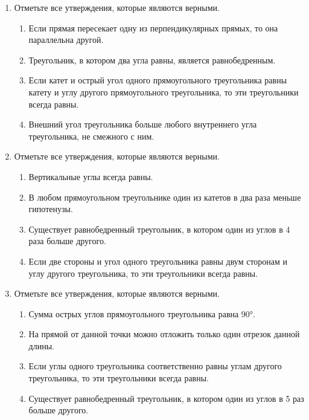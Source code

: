 \documentclass[a4paper,12pt]{article}
\newcommand{\taskspace}{\par\vspace{0.42cm}}
\begin{document}
\begin{enumerate}[resume]
\taskspace

\item Отметьте все утверждения, которые являются верными.
\begin{enumerate}[label=\arabic*),leftmargin=8mm,itemsep=0.25em,topsep=0.35em]
\item Если прямая пересекает одну из перпендикулярных прямых, то она параллельна другой.
\item Треугольник, в котором два угла равны, является равнобедренным.
\item Если катет и острый угол одного прямоугольного треугольника равны катету и углу другого прямоугольного треугольника, то эти треугольники всегда равны.
\item Внешний угол треугольника больше любого внутреннего угла треугольника, не смежного с ним.
\end{enumerate}

\taskspace

\item Отметьте все утверждения, которые являются верными.
\begin{enumerate}[label=\arabic*),leftmargin=8mm,itemsep=0.25em,topsep=0.35em]
\item Вертикальные углы всегда равны.
\item В любом прямоугольном треугольнике один из катетов в два раза меньше гипотенузы.
\item Существует равнобедренный треугольник, в котором один из углов в 4 раза больше другого.
\item Если две стороны и угол одного треугольника равны двум сторонам и углу другого треугольника, то эти треугольники всегда равны.
\end{enumerate}

\taskspace

\item Отметьте все утверждения, которые являются верными.
\begin{enumerate}[label=\arabic*),leftmargin=8mm,itemsep=0.25em,topsep=0.35em]
\item Сумма острых углов прямоугольного треугольника равна 90°.
\item На прямой от данной точки можно отложить только один отрезок данной длины.
\item Если углы одного треугольника соответственно равны углам другого треугольника, то эти треугольники всегда равны.
\item Существует равнобедренный треугольник, в котором один из углов в 5 раз больше другого.
\end{enumerate}


\end{enumerate}
\end{document}
